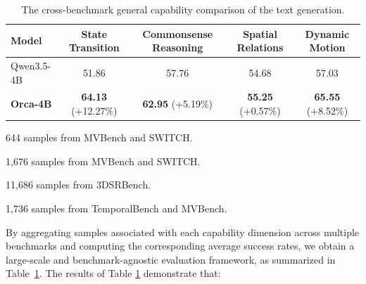 \documentclass{llmxive}
\begin{document}
\begin{table}[!htbp]
  \centering
  \small
  \begin{threeparttable}
    \begin{tabular}{l|cccc} 
    \toprule[1pt]
    Model  & State Transition\tnote{1} & Commonsense Reasoning\tnote{2} & Spatial Relations\tnote{3} & Dynamic Motion\tnote{4} \\
    \midrule[0.5pt]

    Qwen3.5-4B & 51.86 & 57.76 & 54.68 & 57.03 \\

    \rowcolor[rgb]{ .89,  .949,  .851}
    \textbf{Orca-4B}
    & \textbf{64.13} {\scriptsize(+12.27\%)}  
    & \textbf{62.95} {\scriptsize(+5.19\%)}  
    & \textbf{55.25} {\scriptsize(+0.57\%)}  
    & \textbf{65.55} {\scriptsize(+8.52\%)}  \\
    \bottomrule[1pt]
    \end{tabular}

    \begin{tablenotes}
    \footnotesize
    \item[1] 644 samples from {MVBench and SWITCH}.
    \item[2] 1,676 samples from {MVBench and SWITCH}.
    \item[3] 11,686 samples from 3DSRBench.
    \item[4] 1,736 samples from {TemporalBench and MVBench}.
    \end{tablenotes}
  \end{threeparttable}
\caption{The cross-benchmark general capability comparison of the text generation.}
\label{tab:comparison_tol_cap}
\end{table}


By aggregating samples associated with each capability dimension across multiple benchmarks and computing the corresponding average success rates, we obtain a large-scale and benchmark-agnostic evaluation framework, as summarized in Table~\ref{tab:comparison_tol_cap}. The results of Table \ref{tab:comparison_tol_cap} demonstrate that:
\end{document}
